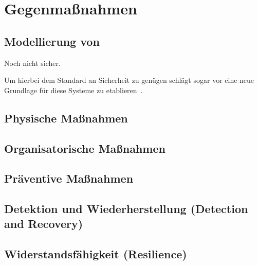\documentclass[final,bibliography=totocnumbered]{include/sikseminar}
\begin{document}
\section{Gegenmaßnahmen}\label{sec:gegenmassnahmen}




\subsection{Modellierung von }\label{subsec:modellierung}
Noch nicht sicher.

Um hierbei dem Standard an Sicherheit zu genügen schlägt \citeauthor{Lee08} sogar vor eine neue Grundlage für diese Systeme zu etablieren~\cite{Lee08}.

\subsection{Physische Maßnahmen}\label{subsec:physisch}

\subsection{Organisatorische Maßnahmen}\label{subsec:orga}

\subsection{Präventive Maßnahmen}\label{subsec:präventiv}

\subsection{Detektion und Wiederherstellung (Detection and Recovery)}\label{subsec:detektion}

\subsection{Widerstandsfähigkeit (Resilience)}\label{subsec:widerstand} %
\end{document}
